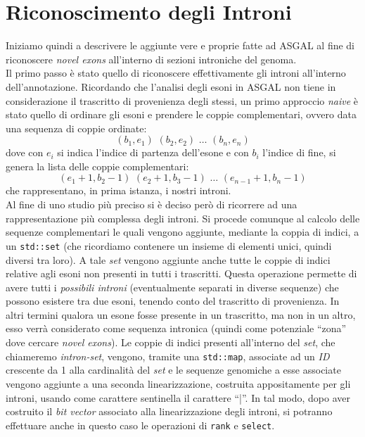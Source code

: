 \documentclass[a4paper,12pt, oneside]{book}
\begin{document}
\section{Riconoscimento degli Introni}
Iniziamo quindi a descrivere le aggiunte vere e proprie fatte ad ASGAL al fine
di riconoscere \textit{novel exons} all'interno di sezioni introniche del
genoma.\\
Il primo passo è stato quello di riconoscere effettivamente gli introni
all'interno dell'annotazione. Ricordando che l'analisi degli esoni in ASGAL non
tiene in considerazione il trascritto di provenienza degli stessi, un primo
approccio \textit{naive} è stato quello di ordinare gli esoni e prendere le
coppie complementari, ovvero data una sequenza di coppie ordinate:
\[(b_1,e_1)\,\,(b_2,e_2)\,\,\ldots \,\,(b_n,e_n)\]
dove con $e_i$ si indica l'indice di partenza dell'esone e con $b_i$ l'indice di
fine, si genera la lista delle coppie complementari:
\[(e_1+1,b_2-1)\,\,(e_2+1,b_3-1)\,\,\ldots \,\,(e_{n-1}+1,b_n-1)\]
che rappresentano, in prima istanza, i nostri introni.\\
Al fine di uno studio più preciso si è deciso però di ricorrere ad una
rappresentazione più complessa degli introni. Si procede comunque al calcolo
delle sequenze complementari le quali vengono aggiunte, mediante la coppia di
indici, a un \texttt{std::set} 
(che ricordiamo contenere un insieme di elementi unici, quindi diversi tra
loro). A tale \textit{set} vengono aggiunte anche tutte le coppie di indici
relative agli esoni non 
presenti in tutti i trascritti. Questa operazione permette di avere tutti i
\textit{possibili introni} (eventualmente separati in diverse sequenze) che
possono esistere tra due esoni, tenendo conto del 
trascritto di provenienza. In altri termini qualora un esone fosse presente in
un trascritto, ma non in un altro, esso verrà considerato come sequenza intronica
(quindi come potenziale ``zona'' dove cercare \textit{novel exons}). Le coppie di
indici presenti all'interno 
del \textit{set}, che chiameremo \textit{intron-set}, vengono, tramite una
\texttt{std::map}, associate ad un \textit{ID} crescente da 1 alla cardinalità
del \textit{set} e le sequenze genomiche a esse associate vengono aggiunte a
una seconda linearizzazione, costruita appositamente per gli introni, usando
come carattere sentinella il carattere ``|''. In tal modo, dopo aver costruito
il \textit{bit vector} associato alla linearizzazione degli introni, si potranno
effettuare anche in questo caso le operazioni di \texttt{rank} e
\texttt{select}.\\
\end{document}
